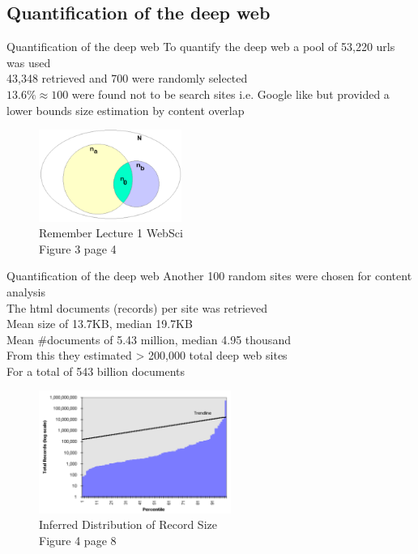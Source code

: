 \documentclass{beamer}
\begin{document}
\subsection{Quantification of the deep web}
\begin{frame}[fragile]{Quantification of the deep web}
To quantify the deep web a pool of 53,220 urls was used \\  
 43,348 retrieved and 700 were randomly selected \\
$13.6\% \approx 100$ were found not to be search sites i.e. Google like
but provided a lower bounds size estimation by content overlap
\begin{figure}
			\includegraphics[height=3cm]{overlapAnalysis.png}
			\caption{Remember Lecture 1 WebSci \\ Figure 3 page 4}
	\end{figure}
\end{frame}
\begin{frame}[fragile]{Quantification of the deep web}
Another 100 random sites were chosen for content analysis \\
The html documents (records) per site was retrieved  \\
Mean size of 13.7KB, median 19.7KB  \\
Mean \#documents of 5.43 million, median 4.95 thousand \\
From this they estimated > 200,000 total deep web sites \\
For a total of 543 billion documents 
\begin{figure}

  \begin{minipage}[c]{0.3\textwidth}
   \caption{ \footnotesize{Inferred Distribution of Record Size} \\ Figure 4 page 8}
  \end{minipage}
			\begin{minipage}[c]{0.67\textwidth}
   \includegraphics[height=4cm]{inferedDWRecSize.png}
  \end{minipage}
			
	\end{figure}
\end{frame}
\end{document}
